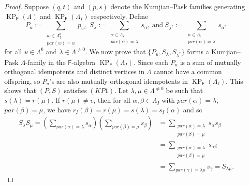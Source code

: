 \documentclass[12pt]{amsart}
\newcommand{\KP}{\operatorname{KP}}
\theoremstyle{definition}
\theoremstyle{remark}
\begin{document}
\begin{proof}
Suppose $(q,t)$ and $(p,s)$ denote the Kumjian--Pask families generating $\KP_\mathsf{F}(\Lambda)$ and $\KP_\mathsf{F}(\Lambda_I)$ respectively. Define \[P_u:=\displaystyle{\sum_{\substack{w\in \Lambda_I^0\\par(w)=u}}} p_w,~S_\lambda:=\displaystyle{\sum_{\substack{\alpha\in \Lambda_I\\par(\alpha)=\lambda}}} s_\alpha,~\text{and}~S_{\lambda^*}:=\displaystyle{\sum_{\substack{\alpha\in \Lambda_I\\par(\alpha)=\lambda}}} s_{\alpha^*}\] for all $u\in \Lambda^0$ and $\lambda\in \Lambda^{\neq 0}$. We now prove that $\{P_u,S_\lambda,S_{\lambda^*}\}$ forms a Kumjian--Pask $\Lambda$-family in the $\mathsf{F}$-algebra $\KP_\mathsf{F}(\Lambda_I)$. Since each $P_u$ is a sum of mutually orthogonal idempotents and distinct vertices in $\Lambda$ cannot have a common offspring, so $P_u$'s are also mutually orthogonal idempotents in $\KP_\mathsf{F}(\Lambda_I)$. This shows that $(P,S)$ satisfies $(KP1)$. Let $\lambda,\mu\in \Lambda^{\neq 0}$ be such that $s(\lambda)=r(\mu)$. If $r(\mu)\neq v$, then for all $\alpha,\beta\in \Lambda_I$ with $par(\alpha)=\lambda$, $par(\beta)=\mu$, we have $r_I(\beta)=r(\mu)=s(\lambda)=s_I(\alpha)$ and so
\begin{align*}
    S_\lambda S_\mu=\left(\displaystyle{\sum_{par(\alpha)=\lambda}} s_\alpha\right)\left(\displaystyle{\sum_{par(\beta)=\mu}} s_\beta\right) &=\displaystyle{\sum_{\substack{par(\alpha)=\lambda\\par(\beta)=\mu}}} s_\alpha s_\beta\\
    &= \displaystyle{\sum_{\substack{par(\alpha)=\lambda\\par(\beta)=\mu}}} s_{\alpha\beta}\\
    &= \displaystyle{\sum_{par(\gamma)=\lambda\mu}} s_\gamma=S_{\lambda\mu}.
\end{align*}

\end{proof}
\end{document}
